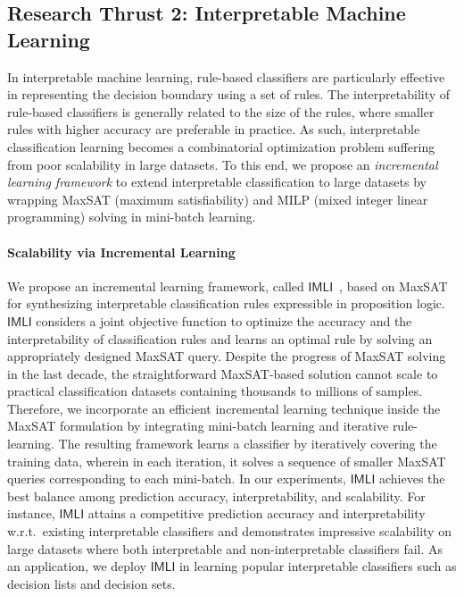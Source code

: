\documentclass[11pt]{article}
\begin{document}
	
	
	\subsection*{Research Thrust 2: Interpretable Machine Learning}

	In interpretable machine learning, rule-based classifiers are particularly effective in representing the decision boundary using a set of rules. The interpretability of rule-based classifiers is generally related to the size of the rules, where smaller rules with higher accuracy are preferable in practice. As such, interpretable classification learning becomes a combinatorial optimization problem suffering from poor scalability in large datasets. To this end, we propose an \textit{incremental learning framework} to extend interpretable classification to large datasets by wrapping MaxSAT (maximum satisfiability) and MILP (mixed integer linear programming) solving in mini-batch learning.
	
	\paragraph{Scalability via Incremental Learning}
	We propose an incremental learning framework, called $ \mathsf{IMLI} $~\cite{ghosh22efficient,ghosh2019incremental},  based on MaxSAT for synthesizing interpretable classification rules expressible in proposition logic. $ \mathsf{IMLI} $ considers a joint objective function to optimize the accuracy and the interpretability of classification rules and learns an optimal rule by solving an appropriately designed MaxSAT query. Despite the progress of MaxSAT solving in the last decade, the straightforward MaxSAT-based solution cannot scale to practical classification datasets containing thousands to millions of samples. Therefore, we incorporate an efficient incremental learning technique inside the MaxSAT formulation by integrating mini-batch learning and iterative rule-learning. The resulting framework learns a classifier by iteratively covering the training data, wherein in each iteration, it solves a sequence of smaller MaxSAT queries corresponding to each mini-batch. In our experiments, $ \mathsf{IMLI} $ achieves the best balance among prediction accuracy, interpretability, and scalability. For instance, $ \mathsf{IMLI} $ attains a competitive prediction accuracy and interpretability w.r.t.\ existing interpretable classifiers and demonstrates impressive scalability on large datasets where both interpretable and non-interpretable classifiers fail. As an application, we deploy $ \mathsf{IMLI} $ in learning popular interpretable classifiers such as decision lists and decision sets.
	
\end{document}
